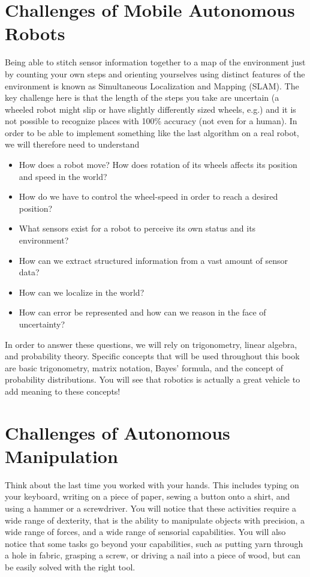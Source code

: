 \section{Challenges of Mobile Autonomous Robots}

Being able to stitch sensor information together to a map of the environment just by counting your own steps and orienting yourselves using distinct features of the environment is known as Simultaneous Localization and Mapping (SLAM). The key challenge here is that the length of the steps you take are uncertain (a wheeled robot might slip or have slightly differently sized wheels, e.g.) and it is not possible to recognize places with 100\% accuracy (not even for a human). In order to be able to implement something like the last algorithm on a real robot, we will therefore need to understand

\begin{itemize}
\item How does a robot move? How does rotation of its wheels affects its position and speed in the world?
\item How do we have to control the wheel-speed in order to reach a desired position?
\item What sensors exist for a robot to perceive its own status and its environment?
\item How can we extract structured information from a vast amount of sensor data?
\item How can we localize in the world?
\item How can error be represented and how can we reason in the face of uncertainty?
\end{itemize}

In order to answer these questions, we will rely on trigonometry, linear algebra, and probability theory. Specific concepts that will be used throughout this book are basic trigonometry, matrix notation, Bayes' formula, and the concept of probability distributions. You will see that robotics is actually a great vehicle to add meaning to these concepts!


\section{Challenges of Autonomous Manipulation}
Think about the last time you worked with your hands. This includes typing on your keyboard, writing on a piece of paper, sewing a button onto a shirt, and using a hammer or a screwdriver. You will notice that these activities require a wide range of dexterity, that is the ability to manipulate objects with precision, a wide range of forces, and a wide range of sensorial capabilities. You will also notice that some tasks go beyond your capabilities, such as putting yarn through a hole in fabric, grasping a screw, or driving a nail into a piece of wood, but can be easily solved with the right tool.

